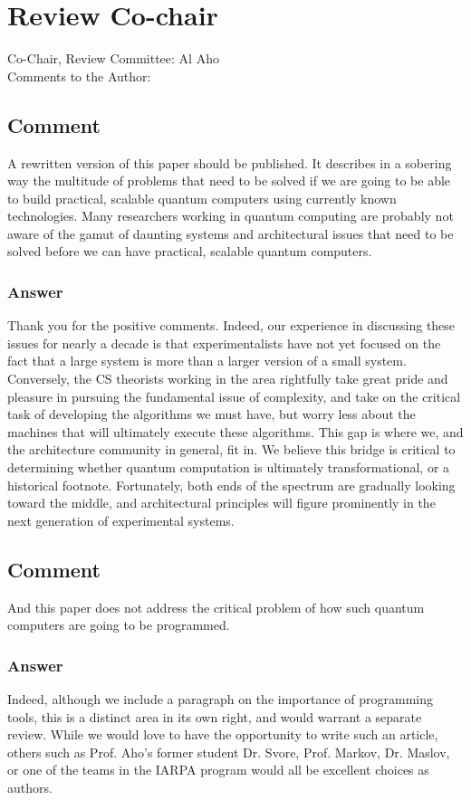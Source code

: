 \documentclass{article}
\newcommand{\comment}{\subsection{Comment}\em}
\newcommand{\answer}{\rm \subsubsection*{Answer}}
\begin{document}
\section{Review Co-chair}

Co-Chair, Review Committee: Al Aho\\
Comments to the Author:\\

\comment

A rewritten version of this paper should be published.  It describes
in a sobering way the multitude of problems that need to be solved if
we are going to be able to build practical, scalable quantum computers
using currently known technologies.  Many researchers working in
quantum computing are probably not aware of the gamut of daunting
systems and architectural issues that need to be solved before we can
have practical, scalable quantum computers.

\answer

Thank you for the positive comments.  Indeed, our experience in
discussing these issues for nearly a decade is that experimentalists
have not yet focused on the fact that a large system is more than a
larger version of a small system.  Conversely, the CS theorists
working in the area rightfully take great pride and pleasure in
pursuing the fundamental issue of complexity, and take on the critical
task of developing the algorithms we must have, but worry less about
the machines that will ultimately execute these algorithms.  This gap
is where we, and the architecture community in general, fit in.  We
believe this bridge is critical to determining whether quantum
computation is ultimately transformational, or a historical footnote.
Fortunately, both ends of the spectrum are gradually looking toward
the middle, and architectural principles will figure prominently in
the next generation of experimental systems.

\comment

And this paper does not address the critical problem of how such
quantum computers are going to be programmed.

\answer

Indeed, although we include a paragraph on the importance of
programming tools, this is a distinct area in its own right, and would
warrant a separate review.  While we would love to have the
opportunity to write such an article, others such as Prof. Aho's
former student Dr. Svore, Prof. Markov, Dr. Maslov, or one of the
teams in the IARPA program would all be excellent choices as authors.
\end{document}
